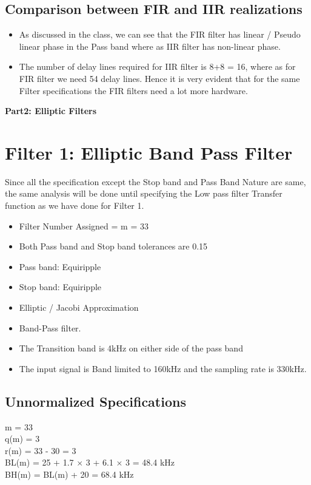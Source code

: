 \documentclass[12pt]{article}
\begin{document}
\color{cyan}
\subsection{Comparison between FIR and IIR realizations}
\color{black}
\begin{itemize}
	\item As discussed in the class, we can see that the FIR filter has linear / Pseudo linear phase in the Pass band where as IIR filter has non-linear phase.
	\item The number of delay lines required for IIR filter is 8+8 = 16, where as for FIR filter we need 54 delay lines.  Hence it is very evident that for the same Filter specifications the FIR filters need a lot more hardware. 
\end{itemize}

\newpage
\color{darkblue}
\noindent\textbf{\Large{Part2: Elliptic Filters}}
\section{Filter 1: Elliptic Band Pass Filter}
\color{black}
Since all the specification except the Stop band and Pass Band Nature are same, the same analysis will be done until specifying the Low pass filter Transfer function as we have done for Filter 1. \begin{itemize}
	\item Filter Number Assigned = m = 33
	\item Both Pass band and Stop band tolerances are 0.15
	\item Pass band: Equiripple 
	\item Stop band: Equiripple
	\item Elliptic / Jacobi Approximation
	\item Band-Pass filter.
	\item The Transition band is 4kHz on either side of the pass band
	\item The input signal is Band limited to 160kHz and the sampling rate is 330kHz.
\end{itemize}
\color{cyan}
\subsection{Unnormalized Specifications}
\color{black}
m = 33\\
q(m) = 3\\
r(m) = 33 - 30 = 3\\
BL(m) = 25 + 1.7 $\times$ 3 + 6.1 $\times$ 3 = 48.4 kHz\\
BH(m) = BL(m) + 20 = 68.4 kHz\\
\end{document}
